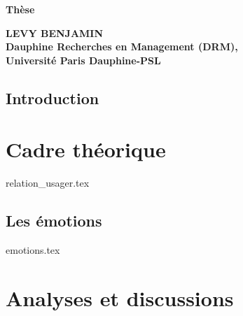 \documentclass[a4paper,12pt, openany]{book}
\begin{document}
\frontmatter

\begin{titlepage}
\vspace*{3cm}

\begin{center}
\LARGE{\textbf{Thèse}}
\end{center}

\vspace{3cm}

\begin{center}
\hspace{3cm}
\textbf{LEVY BENJAMIN %
} \hspace*{3cm} \\ \medskip
     \textbf{Dauphine Recherches en Management  (DRM),\\
      Université Paris Dauphine-PSL
}
\end{center}

\vspace{1cm}
\end{titlepage}

\let\cleardoublepage\clearpage
{
  \setlength{\parskip}{0pt}
  \setlength{\parindent}{15pt}
  \tableofcontents
}


\mainmatter

\chapter{Introduction}

\part{Cadre théorique}


{relation_usager.tex}



\chapter{Les émotions}

{emotions.tex}

\break


\part{Analyses et discussions}
\end{document}
